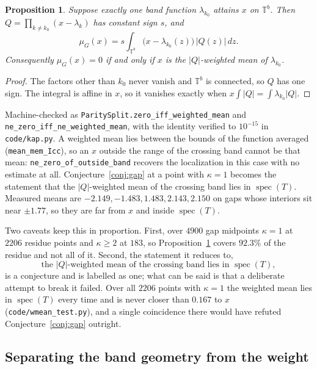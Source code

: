 \documentclass[11pt]{article}
\newtheorem{proposition}[theorem]{Proposition}
\theoremstyle{remark}
\begin{document}
\begin{proposition}\label{prop:wmean}
Suppose exactly one band function $\lambda_{k_0}$ attains $x$ on $\mathbb T^b$. Then
$Q=\prod_{k\ne k_0}(x-\lambda_k)$ has constant sign $s$, and
\[
   \mu_G(x)=s\int_{\mathbb T^b}\bigl(x-\lambda_{k_0}(z)\bigr)\,|Q(z)|\,dz .
\]
Consequently $\mu_G(x)=0$ if and only if $x$ is the $|Q|$-weighted mean of $\lambda_{k_0}$.
\end{proposition}

\begin{proof}
The factors other than $k_0$ never vanish and $\mathbb T^b$ is connected, so $Q$ has one sign.
The integral is affine in $x$, so it vanishes exactly when
$x\int|Q|=\int\lambda_{k_0}|Q|$.
\end{proof}

Machine-checked as \texttt{ParitySplit.zero\_iff\_weighted\_mean} and
\texttt{ne\_zero\_iff\_ne\_weighted\_mean}, with the identity verified to $10^{-15}$ in
\texttt{code/kap.py}. A weighted mean lies between the bounds of the function averaged
(\texttt{mean\_mem\_Icc}), so an $x$ outside the range of the crossing band cannot be that
mean: \texttt{ne\_zero\_of\_outside\_band} recovers the localization in this case with no
estimate at all. Conjecture~\ref{conj:gap} at a point with $\kappa=1$ becomes the statement
that the $|Q|$-weighted mean of the crossing band lies in $\operatorname{spec}(T)$. Measured
means are $-2.149,-1.483,1.483,2.143,2.150$ on gaps whose interiors sit near $\pm1.77$, so
they are far from $x$ and inside $\operatorname{spec}(T)$.

Two caveats keep this in proportion. First, over $4900$ gap midpoints $\kappa=1$ at $2206$
residue points and $\kappa\ge2$ at $183$, so Proposition~\ref{prop:wmean} covers $92.3\%$ of
the residue and not all of it. Second, the statement it reduces to,
\[
   \text{the } |Q|\text{-weighted mean of the crossing band lies in }\operatorname{spec}(T),
\]
is a conjecture and is labelled as one; what can be said is that a deliberate attempt to
break it failed. Over all $2206$ points with $\kappa=1$ the weighted mean lies in
$\operatorname{spec}(T)$ every time and is never closer than $0.167$ to $x$
(\texttt{code/wmean\_test.py}), and a single coincidence there would have refuted
Conjecture~\ref{conj:gap} outright.

\subsection{Separating the band geometry from the weight}\label{sec:split}
\end{document}
